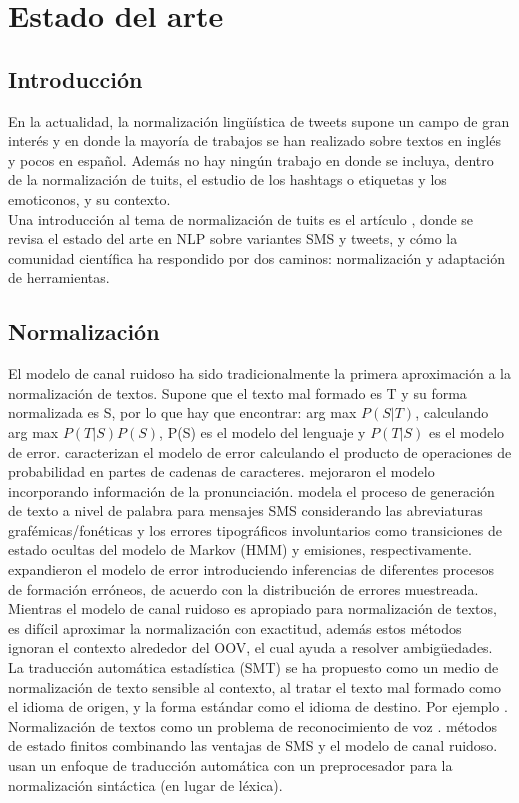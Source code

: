 \documentclass[spanish,12pt, a4paper,twoside]{paper}
\let\oldsection\section
\def\section{\cleardoublepage\oldsection}
\begin{document}
\section{Estado del arte}\label{sec:estadodelarte}
\subsection{Introducción}\label{sec:introduccion}
En la actualidad, la normalización lingüística de tweets \cite{baldwin:2011} supone un campo de gran interés y en donde la mayoría de trabajos se han realizado sobre textos en inglés y pocos en español. Además no hay ningún trabajo en donde se incluya, dentro de la normalización de tuits, el estudio de los hashtags o etiquetas y los emoticonos, y su contexto. \\
Una introducción al tema de normalización de tuits es el artículo \cite{eisenstein:2013}, donde se revisa el estado del arte en NLP sobre variantes SMS y tweets, y cómo la comunidad científica ha respondido por dos caminos: normalización y adaptación de herramientas.
\subsection{Normalización}\label{sec:normalizacion}
El modelo de canal ruidoso \cite{shannon:1948} ha sido tradicionalmente la primera aproximación a la normalización de textos. Supone que el texto mal formado es T y su forma normalizada es S, por lo que hay que encontrar: arg max $P(S|T)$, calculando arg max $P(T|S) P(S)$, P(S) es el modelo del lenguaje y $P(T|S)$ es el modelo de error. \cite{brillmoore:2000} caracterizan el modelo de error calculando el producto de operaciones de probabilidad en partes de cadenas de caracteres. \cite{toutanovamoore:2002} mejoraron el modelo incorporando información de la pronunciación. \cite{choudhury:2007} modela el proceso de generación de texto a nivel de palabra para mensajes SMS considerando las abreviaturas grafémicas/fonéticas y los errores tipográficos involuntarios como transiciones de estado ocultas del modelo de Markov (HMM) y emisiones, respectivamente. \cite{cookstevenson:2009} expandieron el modelo de error introduciendo inferencias de diferentes procesos de formación erróneos, de acuerdo con la distribución de errores muestreada.\\

Mientras el modelo de canal ruidoso es apropiado para normalización de textos, es difícil aproximar la normalización con exactitud, además estos métodos ignoran el contexto alrededor del OOV, el cual ayuda a resolver ambigüedades. La traducción automática estadística (SMT) se ha propuesto como un medio de normalización de texto sensible al contexto, al tratar el texto mal formado como el idioma de origen, y la forma estándar como el idioma de destino. Por ejemplo \cite{aw:2006}. Normalización de textos como un problema de reconocimiento de voz \cite{kobus:2008}. \cite{beaufort:2002} métodos de estado finitos combinando las ventajas de SMS y el modelo de canal ruidoso. \cite{kaufmannkalita:2010} usan un enfoque de traducción automática con un preprocesador para la normalización sintáctica (en lugar de léxica).\\
\end{document}
